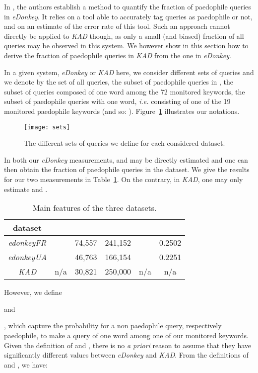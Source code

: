 \documentclass[a4paper,oneside,12pt]{article}
\newcommand{\edonkey}{{\em eDonkey}\xspace}
\newcommand{\edonkeydsfr}{{\em edonkeyFR}\xspace}
\newcommand{\edonkeydsua}{{\em edonkeyUA}\xspace}
\newcommand{\ie}{{\em i.e.}\xspace}
\newcommand{\kad}{{\em KAD}\xspace}
\newcommand{\ipm}{\cite{QuantifyingIPM}\xspace}
\begin{document}
In \ipm, the authors establish a method to quantify the fraction of paedophile queries in \edonkey. It relies on a tool able to accurately tag queries as paedophile or not, and on an estimate of the error rate of this tool. Such an approach cannot directly be applied to \kad though, as only a small (and biased) fraction of all queries may be observed in this system. We however show in this section how to derive the fraction of paedophile queries in \kad from the one in \edonkey.

In a given system, \edonkey or \kad here, we consider different sets of queries and we denote by  the set of all queries,  the subset of paedophile queries in ,  the subset of queries composed of one word among the 72 monitored keywords,  the subset of paedophile queries with one word, \ie consisting of one of the 19 monitored paedophile keywords (and so: ). Figure~\ref{fig-sets} illustrates our notations.

\begin{figure}[!h]
\centering
\texttt{[image: sets]}
\caption{
 The different sets of queries we define for each considered dataset.
}
\label{fig-sets}
\end{figure}

In both our \edonkey measurements,  and  may be directly estimated \ipm and one can then obtain the fraction  of paedophile queries in the dataset. We give the results for our two measurements in Table~\ref{table-inference}. On the contrary, in \kad, one may only estimate  and . 

\begin{table}[!ht]
\centering
\begin{tabular}{|c|c|c|c|c|c|}
\hline
\rule[-1.55ex]{0cm}{4.5ex} dataset &  &  &  &  &  \\
\hline
\edonkeydsfr &  & 74,557 & 241,152 &  & 0.2502  \\
\hline
\edonkeydsua &  & 46,763 & 166,154 &   & 0.2251 \\ 
\hline
\kad & n/a & 30,821 & 250,000 & \mbox{n/a} & \mbox{n/a} \\
\hline
\end{tabular}
\caption{Main features of the three datasets.}
\label{table-inference}
\end{table}

However, we define 
 
and 

, which capture the probability for a non paedophile query, respectively paedophile, to make a query of one word among one of our monitored keywords. Given the definition of  and , there is no {\em a priori} reason to assume that they have significantly different values between \edonkey and \kad. From the definitions of  and , we have:
\end{document}

